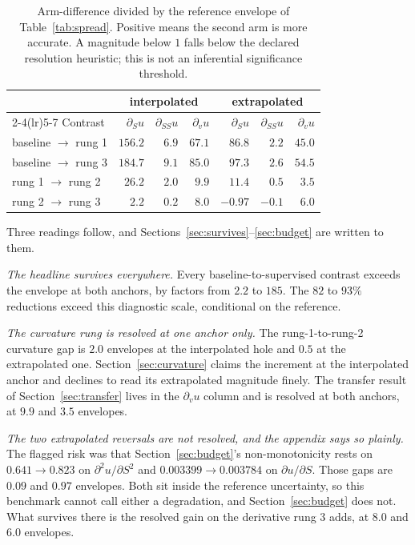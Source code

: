 \documentclass{article}
\begin{document}
\begin{table}[!htbp]
\caption{Arm-difference divided by the reference envelope of Table~\ref{tab:spread}.
Positive means the second arm is more accurate. A magnitude below $1$ falls below the declared
resolution heuristic; this is not an inferential significance threshold.}
\label{tab:resolve}
\centering\footnotesize\setlength{\tabcolsep}{5pt}
\begin{tabular}{@{}lrrrrrr@{}}
\toprule
& \multicolumn{3}{c}{interpolated} & \multicolumn{3}{c}{extrapolated} \\
\cmidrule(lr){2-4}\cmidrule(lr){5-7}
Contrast & $\partial_S u$ & $\partial_{SS} u$ & $\partial_v u$
         & $\partial_S u$ & $\partial_{SS} u$ & $\partial_v u$ \\
\midrule
baseline $\to$ rung 1 & $156.2$ & $6.9$ & $67.1$ & $86.8$ & $2.2$ & $45.0$ \\
baseline $\to$ rung 3 & $184.7$ & $9.1$ & $85.0$ & $97.3$ & $2.6$ & $54.5$ \\
rung 1 $\to$ rung 2 & $26.2$ & $2.0$ & $9.9$ & $11.4$ & $\mathit{0.5}$ & $3.5$ \\
rung 2 $\to$ rung 3 & $2.2$ & $\mathit{0.2}$ & $8.0$ & $\mathit{-0.97}$ & $\mathit{-0.1}$ & $6.0$ \\
\bottomrule
\end{tabular}
\end{table}

Three readings follow, and Sections~\ref{sec:survives}--\ref{sec:budget} are written
to them.

\emph{The headline survives everywhere.} Every baseline-to-supervised contrast
exceeds the envelope at both anchors, by factors from $2.2$ to $185$. The $82$ to
$93\%$ reductions exceed this diagnostic scale, conditional on the reference.

\emph{The curvature rung is resolved at one anchor only.} The rung-1-to-rung-2
curvature gap is $2.0$ envelopes at the interpolated hole and $0.5$ at the
extrapolated one. Section~\ref{sec:curvature} claims the increment at the
interpolated anchor and declines to read its extrapolated magnitude finely. The
transfer result of Section~\ref{sec:transfer} lives in the $\partial_v u$ column and
is resolved at both anchors, at $9.9$ and $3.5$ envelopes.

\emph{The two extrapolated reversals are not resolved, and the appendix says so
plainly.} The flagged risk was that Section~\ref{sec:budget}'s non-monotonicity
rests on $0.641 \to 0.823$ on $\partial^{2}u/\partial S^{2}$ and
$0.003399 \to 0.003784$ on $\partial u/\partial S$. Those gaps are $0.09$ and $0.97$
envelopes. Both sit inside the reference uncertainty, so this benchmark cannot call
either a degradation, and Section~\ref{sec:budget} does not. What survives there is
the resolved gain on the derivative rung 3 adds, at $8.0$ and $6.0$ envelopes.
\end{document}
